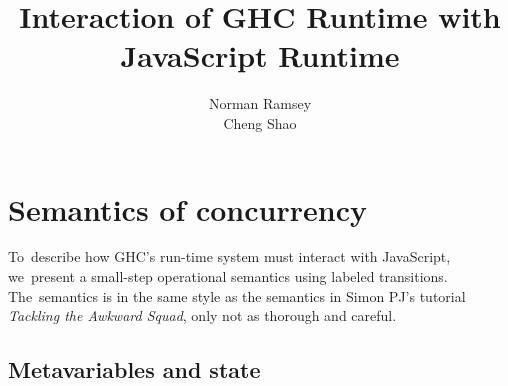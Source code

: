 \documentclass{article}
\begin{document}
\title{Interaction of GHC Runtime with JavaScript Runtime}
\author{Norman Ramsey\\Cheng Shao}

\maketitle




\section{Semantics of concurrency}\label{concurrency-sketch}

To~describe how GHC's run-time system must interact with JavaScript,
we~present a small-step operational semantics using labeled
transitions.
The~semantics is in the same style as the
semantics in Simon PJ's tutorial \emph{Tackling the Awkward Squad},
only not as thorough and careful.

\subsection{Metavariables and state}
\end{document}
